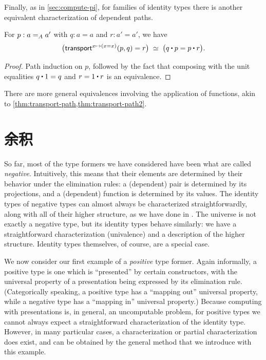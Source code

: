 Finally, as in \cref{sec:compute-pi}, for families of identity types there is another equivalent characterization of dependent paths.

\begin{thm}\label{thm:dpath-path}
  For $p:\id[A]a{a'}$ with $q:a=a$ and $r:a'=a'$, we have
  \[ \eqvspaced{ \big(\transfib{x\mapsto (x=x)}{p}{q} = r \big) }{ \big( q \ct p = p \ct r \big). } \]
\end{thm}
\begin{proof}
  Path induction on $p$, followed by the fact that composing with the unit equalities $q\ct 1 = q$ and $r = 1\ct r$ is an equivalence.
\end{proof}

There are more general equivalences involving the application of functions, akin to \cref{thm:transport-path,thm:transport-path2}.

%

\section{余积}
\label{sec:compute-coprod}

%
%
So far, most of the type formers we have considered have been what are called \emph{negative}.
%
%
Intuitively, this means that their elements are determined by their behavior under the elimination rules: a (dependent) pair is determined by its projections, and a (dependent) function is determined by its values.
The identity types of negative types can almost always be characterized straightforwardly, along with all of their higher structure, as we have done in .
The universe is not exactly a negative type, but its identity types behave similarly: we have a straightforward characterization (univalence) and a description of the higher structure.
Identity types themselves, of course, are a special case.

We now consider our first example of a \emph{positive} type former.
%
Again informally, a positive type is one which is ``presented'' by certain constructors, with the universal property of a presentation being expressed by its elimination rule.
(Categorically speaking, a positive type has a ``mapping out'' universal property, while a negative type has a ``mapping in'' universal property.)
Because computing with presentations is, in general, an uncomputable problem, for positive types we cannot always expect a straightforward characterization of the identity type.
However, in many particular cases, a characterization or partial characterization does exist, and can be obtained by the general method that we introduce with this example.

